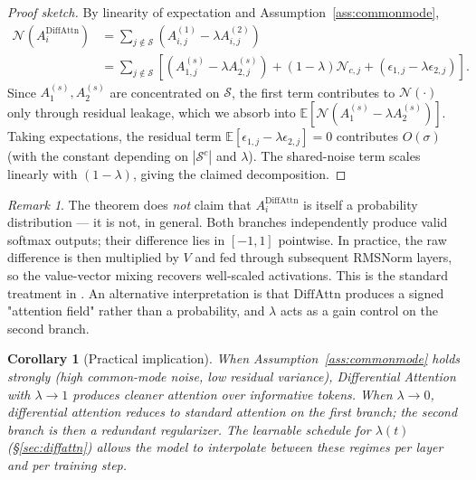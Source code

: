 \documentclass[11pt,a4paper]{article}
\newtheorem{corollary}{Corollary}
\theoremstyle{definition}
\theoremstyle{remark}
\newtheorem{remark}{Remark}
\newcommand{\E}{\mathbb{E}}
\newcommand{\diffattn}{\mathrm{DiffAttn}}
\begin{document}
\begin{proof}[Proof sketch]
By linearity of expectation and Assumption~\ref{ass:commonmode},
\begin{align}
\mathcal{N}(A^{\diffattn}_i)
    &= \sum_{j \notin \mathcal{S}}
       (A^{(1)}_{i,j} - \lambda A^{(2)}_{i,j}) \\
    &= \sum_{j \notin \mathcal{S}}
       \left[
         (A^{(s)}_{1,j} - \lambda A^{(s)}_{2,j})
         + (1 - \lambda) \mathcal{N}_{c,j}
         + (\epsilon_{1,j} - \lambda \epsilon_{2,j})
       \right].
\end{align}
Since $A^{(s)}_1, A^{(s)}_2$ are concentrated on $\mathcal{S}$, the first
term contributes to $\mathcal{N}(\cdot)$ only through residual leakage,
which we absorb into $\E[\mathcal{N}(A^{(s)}_1 - \lambda A^{(s)}_2)]$.
Taking expectations, the residual term
$\E[\epsilon_{1,j} - \lambda \epsilon_{2,j}] = 0$ contributes $O(\sigma)$
(with the constant depending on $|\mathcal{S}^c|$ and $\lambda$).
The shared-noise term scales linearly with $(1 - \lambda)$, giving the
claimed decomposition.
\end{proof}

\begin{remark}
The theorem does \emph{not} claim that $A^{\diffattn}_i$ is itself a
probability distribution --- it is not, in general. Both branches
independently produce valid softmax outputs; their difference lies in
$[-1, 1]$ pointwise. In practice, the raw difference is then multiplied
by $V$ and fed through subsequent RMSNorm layers, so the value-vector
mixing recovers well-scaled activations. This is the standard treatment
in \citet{ye2024differential}. An alternative interpretation is that
$\diffattn$ produces a signed "attention field" rather than a
probability, and $\lambda$ acts as a gain control on the second branch.
\end{remark}

\begin{corollary}[Practical implication]
When Assumption~\ref{ass:commonmode} holds strongly (high common-mode
noise, low residual variance), Differential Attention with
$\lambda \to 1$ produces cleaner attention over informative tokens. When
$\lambda \to 0$, differential attention reduces to standard attention on
the first branch; the second branch is then a redundant regularizer.
The learnable schedule for $\lambda(t)$ (\S\ref{sec:diffattn}) allows
the model to interpolate between these regimes per layer and per
training step.
\end{corollary}
\end{document}

